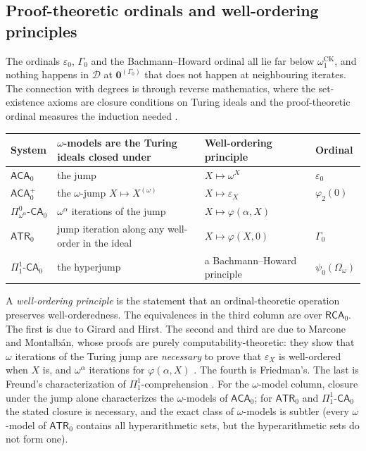 \documentclass[11pt,a4paper]{article}
\newcommand{\D}{\mathcal D}
\newcommand{\zero}{\mathbf0}
\theoremstyle{definition}\newtheorem{definition}[theorem]{Definition}
\theoremstyle{remark}\newtheorem{remark}[theorem]{Remark}
\begin{document}
\subsection{Proof-theoretic ordinals and well-ordering principles}
\label{sec:ordinals-wop}
The ordinals $\varepsilon_0$, $\Gamma_0$ and the Bachmann--Howard ordinal all lie far below $\omega_1^{\mathrm{CK}}$, and nothing happens in $\D$ at $\zero^{(\Gamma_0)}$ that does not happen at neighbouring iterates. The connection with degrees is through reverse mathematics, where the set-existence axioms are closure conditions on Turing ideals and the proof-theoretic ordinal measures the induction needed \cite{Simpson}.
\begin{center}\small
\begin{tabular}{@{}llll@{}}
\toprule
System & $\omega$-models are the Turing ideals closed under & Well-ordering principle & Ordinal\\\midrule
$\mathsf{ACA}_0$ & the jump & $X\mapsto\omega^X$ & $\varepsilon_0$\\
$\mathsf{ACA}_0^+$ & the $\omega$-jump $X\mapsto X^{(\omega)}$ & $X\mapsto\varepsilon_X$ & $\varphi_2(0)$\\
$\Pi^0_{\omega^\alpha}\text{-}\mathsf{CA}_0$ & $\omega^\alpha$ iterations of the jump & $X\mapsto\varphi(\alpha,X)$ & \\
$\mathsf{ATR}_0$ & jump iteration along any well-order in the ideal & $X\mapsto\varphi(X,0)$ & $\Gamma_0$\\
$\Pi^1_1\text{-}\mathsf{CA}_0$ & the hyperjump & a Bachmann--Howard principle & $\psi_0(\Omega_\omega)$\\
\bottomrule
\end{tabular}
\end{center}
A \emph{well-ordering principle} is the statement that an ordinal-theoretic operation preserves well-orderedness. The equivalences in the third column are over $\mathsf{RCA}_0$. The first is due to Girard and Hirst. The second and third are due to Marcone and Montalb\'an, whose proofs are purely computability-theoretic: they show that $\omega$ iterations of the Turing jump are \emph{necessary} to prove that $\varepsilon_X$ is well-ordered when $X$ is, and $\omega^\alpha$ iterations for $\varphi(\alpha,X)$ \cite{MarconeMontalban}. The fourth is Friedman's. The last is Freund's characterization of $\Pi^1_1$-comprehension \cite{Freund}. For the $\omega$-model column, closure under the jump alone characterizes the $\omega$-models of $\mathsf{ACA}_0$; for $\mathsf{ATR}_0$ and $\Pi^1_1\text{-}\mathsf{CA}_0$ the stated closure is necessary, and the exact class of $\omega$-models is subtler (every $\omega$-model of $\mathsf{ATR}_0$ contains all hyperarithmetic sets, but the hyperarithmetic sets do not form one).
\end{document}
